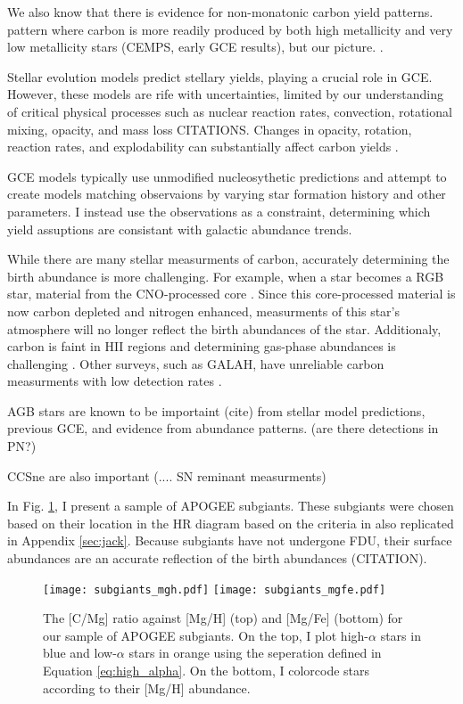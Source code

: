 \documentclass[12pt,oneside]{report}
\begin{document}
We also know that there is evidence for non-monatonic carbon yield patterns. 
pattern where carbon is more readily produced by both high metallicity and very low metallicity stars (CEMPS, early GCE results), but our picture. \citep{FN15,cooke+17,berg+19}.

Stellar evolution models predict stellary yields, playing a crucial role in GCE.  However, these models are rife with uncertainties, limited by our understanding of critical physical processes such as nuclear reaction rates, convection, rotational mixing, opacity, and mass loss CITATIONS. Changes in opacity, rotation, reaction rates, and explodability can substantially affect carbon yields \citep{KL14,V13, LC18, emily+21}.

GCE models typically use unmodified nucleosythetic predictions and attempt to create models matching observaions by varying star formation history and other parameters. I instead use the observations as a constraint, determining which yield assuptions are consistant with galactic abundance trends. 

While there are many stellar measurments of carbon, accurately determining the birth abundance is more challenging. For example, when a star becomes a RGB star, material from the CNO-processed core \citep{fiorenzo+21,KL14}. Since this core-processed material is now carbon depleted and nitrogen enhanced, measurments of this star's atmosphere will no longer reflect the birth abundances of the star.  Additionaly, carbon is faint in HII regions and determining gas-phase abundances is challenging \citet{skillman+20}.
Other surveys, such as GALAH, have unreliable carbon measurments with low detection rates \citep{emily+19}.

AGB stars are known to be importaint (cite) from stellar model predictions, previous GCE, and evidence from abundance patterns. (are there detections in PN?)

CCSne are also important (.... SN reminant measurments)


In Fig. \ref{fig:subgiants}, I present a sample of APOGEE subgiants. These subgiants were chosen based on their location in the HR diagram based on the criteria in \citet{jack_subgiant} also replicated in Appendix \ref{sec:jack}. Because subgiants have not undergone FDU, their surface abundances are an accurate reflection of the birth abundances (CITATION).  




\begin{figure}[htp]
    \texttt{[image: subgiants\_mgh.pdf]}
    \texttt{[image: subgiants\_mgfe.pdf]}
    \caption[APOGEE Subgiants]{The [C/Mg] ratio against [Mg/H] (top) and [Mg/Fe] (bottom) for our sample of APOGEE subgiants. On the top, I plot high-$\alpha$ stars in blue and low-$\alpha$ stars in orange using the seperation defined in Equation \ref{eq:high_alpha}. On the bottom, I colorcode stars according to their [Mg/H] abundance.}
    \label{fig:subgiants}
\end{figure}
\end{document}
